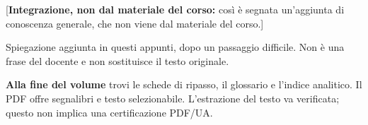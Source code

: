 \documentclass[12pt,a4paper,openany]{book}
\newcommand{\ultimocapitolo}{}
\newcommand{\ultimasezione}{}
\newcommand{\integrazione}[1]{\textcolor{sintesi}{[\textbf{Integrazione, non dal materiale del corso:} #1]}}
\begin{document}
\integrazione{così è segnata un'aggiunta di conoscenza generale, che non viene dal materiale del corso.}

\begin{parolesemplici}
Spiegazione aggiunta in questi appunti, dopo un passaggio difficile. Non è una frase del docente e non sostituisce il testo originale.
\end{parolesemplici}

\textbf{Alla fine del volume} trovi le schede di ripasso, il glossario e l'indice analitico. Il PDF offre segnalibri e testo selezionabile. L'estrazione del testo va verificata; questo non implica una certificazione PDF/UA.

\tableofcontents

\mainmatter


% 

\backmatter


\clearpage\gdef\ultimocapitolo{Indice analitico}\gdef\ultimasezione{}
\printindex[indice]
\end{document}

